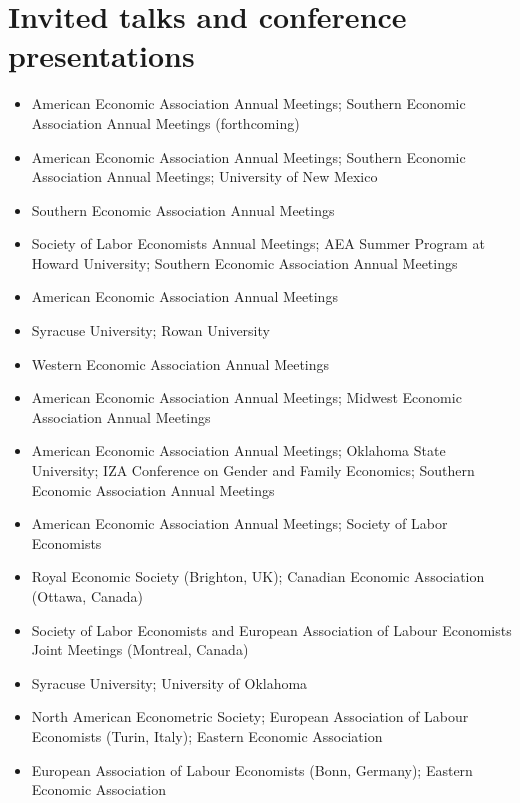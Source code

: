 \documentclass[10.5pt]{article}
\begin{document}
\section{Invited talks and conference presentations}
\begin{itemize}
\item[\textbf{2026}] American Economic Association Annual Meetings; Southern Economic Association Annual Meetings (forthcoming)
\item[\textbf{2025}] American Economic Association Annual Meetings; Southern Economic Association Annual Meetings; University of New Mexico
\item[\textbf{2024}] Southern Economic Association Annual Meetings
\item[\textbf{2023}] Society of Labor Economists Annual Meetings; AEA Summer Program at Howard University; Southern Economic Association Annual Meetings
\item[\textbf{2022}] American Economic Association Annual Meetings
\item[\textbf{2021}] Syracuse University; Rowan University
\item[\textbf{2020}] Western Economic Association Annual Meetings
\item[\textbf{2019}] American Economic Association Annual Meetings; Midwest Economic Association Annual Meetings
\item[\textbf{2018}] American Economic Association Annual Meetings; Oklahoma State University; IZA Conference on Gender and Family Economics; Southern Economic Association Annual Meetings
\item[\textbf{2017}] American Economic Association Annual Meetings; Society of Labor Economists
\item[\textbf{2016}] Royal Economic Society (Brighton, UK); Canadian Economic Association (Ottawa, Canada)
\item[\textbf{2015}] Society of Labor Economists and European Association of Labour Economists Joint Meetings (Montreal, Canada)
\item[\textbf{2014}] Syracuse University; University of Oklahoma
\item[\textbf{2013}] North American Econometric Society; European Association of Labour Economists (Turin, Italy); Eastern Economic Association
\item[\textbf{2012}] European Association of Labour Economists (Bonn, Germany); Eastern Economic Association
\end{itemize}
\end{document}
